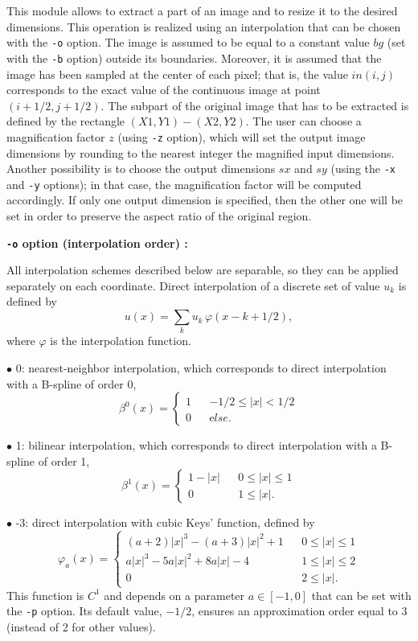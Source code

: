 This module allows to extract a part of an image and to resize it to
the desired dimensions. This operation is realized using an interpolation
that can be chosen with the \verb+-o+ option. The image is assumed
to be equal to a constant value $bg$ (set with the \verb+-b+ option)
outside its boundaries. Moreover, it is assumed that the image
has been sampled at the center of each pixel; that is, the value 
$in(i,j)$ corresponds to the exact value of the continuous image
at point $(i+1/2,j+1/2)$. The subpart of the original image that has
to be extracted is defined by the rectangle $(X1,Y1)-(X2,Y2)$. The user
can choose a magnification factor $z$ (using \verb+-z+ option), 
which will set the output image dimensions by rounding to the nearest 
integer the magnified input dimensions. Another possibility is to choose 
the output dimensions $sx$ and $sy$ (using the \verb+-x+ and \verb+-y+ 
options); in that case, the magnification factor will be computed 
accordingly. If only one output dimension is specified, then the other
one will be set in order to preserve the aspect ratio of the original 
region.

\medskip

{\bf \verb+-o+ option (interpolation order) :} 

\smallskip

All interpolation schemes described below are separable, so they can
be applied separately on each coordinate. Direct interpolation of 
a discrete set of value $u_k$ is defined by 
$$u(x) = \sum_k u_k \,\varphi(x-k+1/2),$$
where $\varphi$ is the interpolation function.

$\bullet$ 0: nearest-neighbor interpolation, which corresponds to direct 
interpolation with a B-spline of order 0,
$$\beta^0(x) = \left\{\begin{array}{lcl}
1	& & -1/2 \leq |x| < 1/2 \\ 
0	& & {\mathrm else}.
\end{array}\right.$$

$\bullet$ 1: bilinear interpolation, which corresponds to direct interpolation
with a B-spline of order 1,
$$\beta^1(x) = \left\{\begin{array}{lcl}
1-|x|	& & 0 \leq |x| \leq 1 \\ 
0	& & 1 \leq |x|.
\end{array}\right.$$

$\bullet$ -3: direct interpolation with cubic Keys' function, defined by
$$\varphi_a(x) = \left\{\begin{array}{lcl}
(a+2)|x|^3 - (a+3)|x|^2+1	& & 0 \leq |x| \leq 1 \\ 
a|x|^3 - 5a|x|^2+8a|x|-4	& & 1 \leq |x| \leq 2 \\ 
0				& & 2 \leq |x|.
\end{array}\right.$$
This function is $C^1$ and depends on a parameter $a \in [-1,0]$ that 
can be set with the \verb+-p+ option. Its default value, $-1/2$,
ensures an approximation order equal to 3 (instead of 2 for other
values).

